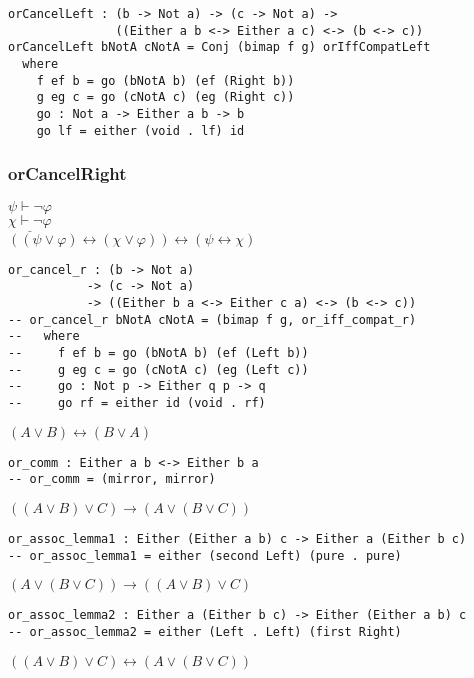 \documentclass{acm_proc_article-sp}
\renewcommand{\iff}{\leftrightarrow}
\renewcommand{\implies}{\rightarrow}
\begin{document}
\begin{verbatim}
orCancelLeft : (b -> Not a) -> (c -> Not a) ->
               ((Either a b <-> Either a c) <-> (b <-> c))
orCancelLeft bNotA cNotA = Conj (bimap f g) orIffCompatLeft
  where
    f ef b = go (bNotA b) (ef (Right b))
    g eg c = go (cNotA c) (eg (Right c))
    go : Not a -> Either a b -> b
    go lf = either (void . lf) id
\end{verbatim}

\subsubsection{orCancelRight}\label{orcancelright}

\(\psi \vdash \neg \varphi\)\\
\(\underline{\chi \vdash \neg \varphi}\)\\
\(((\psi \lor \varphi) \iff (\chi \lor \varphi)) \iff (\psi \iff \chi)\)

\begin{verbatim}
or_cancel_r : (b -> Not a)
           -> (c -> Not a)
           -> ((Either b a <-> Either c a) <-> (b <-> c))
-- or_cancel_r bNotA cNotA = (bimap f g, or_iff_compat_r)
--   where
--     f ef b = go (bNotA b) (ef (Left b))
--     g eg c = go (cNotA c) (eg (Left c))
--     go : Not p -> Either q p -> q
--     go rf = either id (void . rf)
\end{verbatim}

\((A \lor B) \iff (B \lor A)\)

\begin{verbatim}
or_comm : Either a b <-> Either b a
-- or_comm = (mirror, mirror)
\end{verbatim}

\(((A \lor B) \lor C) \implies (A \lor (B \lor C))\)

\begin{verbatim}
or_assoc_lemma1 : Either (Either a b) c -> Either a (Either b c)
-- or_assoc_lemma1 = either (second Left) (pure . pure)
\end{verbatim}

\((A \lor (B \lor C)) \implies ((A \lor B) \lor C)\)

\begin{verbatim}
or_assoc_lemma2 : Either a (Either b c) -> Either (Either a b) c
-- or_assoc_lemma2 = either (Left . Left) (first Right)
\end{verbatim}

\(((A \lor B) \lor C) \iff (A \lor (B \lor C))\)
\end{document}
